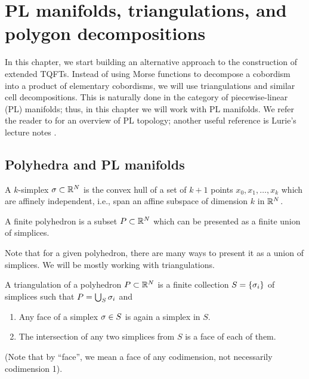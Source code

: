 \chapter{PL manifolds, triangulations, and polygon decompositions}\label{c:PL}

In this chapter, we start building an alternative approach to the construction
of extended TQFTs. Instead of using Morse functions to decompose a cobordism
into a product of elementary cobordisms, we will use triangulations and similar
cell decompositions. This is naturally done in the category of piecewise-linear
(PL) manifolds; thus, in this chapter we will work with PL manifolds. We refer
the reader to \cite{rourke} for an overview of PL topology; another useful
reference is Lurie's lecture notes \cite{lurie-PL}.

\section{Polyhedra and PL manifolds}\label{s:polyhedra-pl}
\begin{definition}
  A $k$-simplex $\sigma\subset \mathbb{R}^N$ is the convex hull of a set of $k+1$ points
  $x_0, x_1, \dots, x_k$ which are affinely independent, i.e., span an affine
  subspace of dimension $k$ in $\mathbb{R}^N$.

  A finite polyhedron is a subset $P\subset \mathbb{R}^N$ which can be presented as a
  finite union of simplices.
\end{definition}
Note that for a given polyhedron, there are many ways to present it as a union
of simplices. We will be mostly working with triangulations.

\begin{definition}\label{d:triangulation}
  A triangulation of a polyhedron $P\subset \mathbb{R}^N$ is a finite
  collection $S=\{\sigma_i\}$ of simplices such that $P=\bigcup_S \sigma_i$
  and
  \begin{enumerate}
    \item Any face of a simplex $\sigma\in S$ is again a simplex in $S$.
    \item The intersection of any two simplices from $S$ is a face of each of them.
  \end{enumerate}
\end{definition}
(Note that by ``face'', we mean a face of any codimension, not necessarily
 codimension 1).


